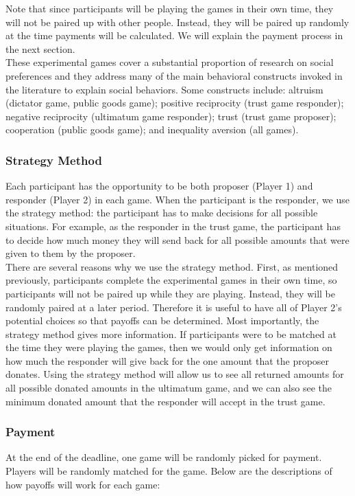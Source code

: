 \documentclass{article}
\begin{document}
Note that since participants will be playing the games in their own time, they will not be paired up with other people. Instead, they will be paired up randomly at the time payments will be calculated. We will explain the payment process in the next section. \\
 
These experimental games cover a substantial proportion of research on social preferences and they address many of the main behavioral constructs invoked in the literature to explain social behaviors. Some constructs include: altruism (dictator game, public goods game); positive reciprocity (trust game  responder); negative reciprocity (ultimatum game responder); trust (trust game proposer); cooperation (public goods game); and inequality aversion (all games). 

\subsubsection{Strategy Method}

Each participant has the opportunity to be both proposer (Player 1) and responder (Player 2) in each game. When the participant is the responder, we use the strategy method: the participant has to make decisions for all possible situations. For example, as the responder in the trust game, the participant has to decide how much money they will send back for all possible amounts that were given to them by the proposer. \\

There are several reasons why we use the strategy method. First, as mentioned previously, participants complete the experimental games in their own time, so participants will not be paired up while they are playing. Instead, they will be randomly paired at a later period. Therefore it is useful to have all of Player 2\rq s potential choices so that payoffs can be determined. Most importantly, the strategy method gives more information. If participants were to be matched at the time they were playing the games, then we would only get information on how much the responder will give back for the one amount that the proposer donates. Using the strategy method will allow us to see all returned amounts for all possible donated amounts in the ultimatum game, and we can also see the minimum donated amount that the responder will accept in the trust game. \\

\subsubsection{Payment}
At the end of the deadline, one game will be randomly picked for payment. Players will be randomly matched for the game. Below are the descriptions of how payoffs will work for each game: 
\end{document}
